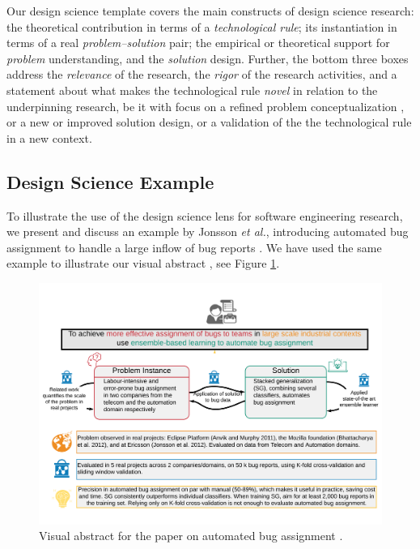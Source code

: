 \documentclass[graybox]{svmult}
\begin{document}
Our design science template covers the main constructs of design science research: the theoretical contribution in terms of a \emph{technological rule}; its instantiation in terms of a real \emph{problem--solution} pair;  the empirical or theoretical support for \emph{problem} understanding, and the \emph{solution} design. Further, the bottom three boxes address the \emph{relevance} of the research, the \emph{rigor} of the research activities,  and a statement about what makes the technological rule \emph{novel} in relation to the underpinning research, be it with focus on a refined problem conceptualization , or a new or improved solution design, or a validation of the the technological rule in a new context. 



\subsection{Design Science Example}
\label{sec:examples}
To illustrate the use of the design science lens for software engineering research, we present and discuss an example by Jonsson \emph{et al.}, introducing automated bug assignment to handle a large inflow of bug reports \cite{JonssonBug15}. We have used the same example to illustrate our visual abstract \cite{StoreyESEM17}, see Figure \ref{fig:BugAssignment}.

\begin{figure}[t]
\begin{center}
\includegraphics[width=\columnwidth, trim={5mm 20mm 5mm 20mm },clip]{Figures/VATemplateJonsson.pdf}
\caption{Visual abstract for the paper on automated bug assignment \cite{JonssonBug15}.}
\label{fig:BugAssignment}
\end{center}
\end{figure}
\end{document}
